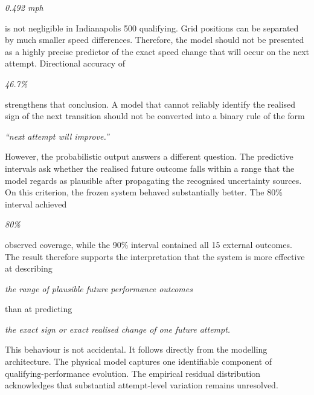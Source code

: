 \begin{center}\textit{0.492 mph}\end{center}

is not negligible in Indianapolis 500 qualifying. Grid positions can be separated by much smaller speed differences. Therefore, the model should not be presented as a highly precise predictor of the exact speed change that will occur on the next attempt. Directional accuracy of

\begin{center}\textit{46.7\%}\end{center}

strengthens that conclusion. A model that cannot reliably identify the realised sign of the next transition should not be converted into a binary rule of the form

\begin{center}\textit{``next attempt will improve.''}\end{center}

However, the probabilistic output answers a different question. The predictive intervals ask whether the realised future outcome falls within a range that the model regards as plausible after propagating the recognised uncertainty sources. On this criterion, the frozen system behaved substantially better. The 80\% interval achieved

\begin{center}\textit{80\%}\end{center}

observed coverage, while the 90\% interval contained all 15 external outcomes. The result therefore supports the interpretation that the system is more effective at describing

\begin{center}\textit{the range of plausible future performance outcomes}\end{center}

than at predicting

\begin{center}\textit{the exact sign or exact realised change of one future attempt.}\end{center}

This behaviour is not accidental. It follows directly from the modelling architecture. The physical model captures one identifiable component of qualifying-performance evolution. The empirical residual distribution acknowledges that substantial attempt-level variation remains unresolved.

